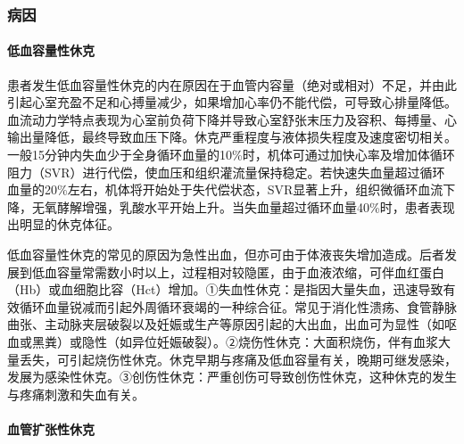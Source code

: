 \subsubsection{病因}

\paragraph{低血容量性休克}

患者发生低血容量性休克的内在原因在于血管内容量（绝对或相对）不足，并由此引起心室充盈不足和心搏量减少，如果增加心率仍不能代偿，可导致心排量降低。血流动力学特点表现为心室前负荷下降并导致心室舒张末压力及容积、每搏量、心输出量降低，最终导致血压下降。休克严重程度与液体损失程度及速度密切相关。一般15分钟内失血少于全身循环血量的10\%时，机体可通过加快心率及增加体循环阻力（SVR）进行代偿，使血压和组织灌流量保持稳定。若快速失血量超过循环血量的20\%左右，机体将开始处于失代偿状态，SVR显著上升，组织微循环血流下降，无氧酵解增强，乳酸水平开始上升。当失血量超过循环血量40\%时，患者表现出明显的休克体征。

低血容量性休克的常见的原因为急性出血，但亦可由于体液丧失增加造成。后者发展到低血容量常需数小时以上，过程相对较隐匿，由于血液浓缩，可伴血红蛋白（Hb）或血细胞比容（Hct）增加。①失血性休克：是指因大量失血，迅速导致有效循环血量锐减而引起外周循环衰竭的一种综合征。常见于消化性溃疡、食管静脉曲张、主动脉夹层破裂以及妊娠或生产等原因引起的大出血，出血可为显性（如呕血或黑粪）或隐性（如异位妊娠破裂）。②烧伤性休克：大面积烧伤，伴有血浆大量丢失，可引起烧伤性休克。休克早期与疼痛及低血容量有关，晚期可继发感染，发展为感染性休克。③创伤性休克：严重创伤可导致创伤性休克，这种休克的发生与疼痛刺激和失血有关。

\paragraph{血管扩张性休克}

